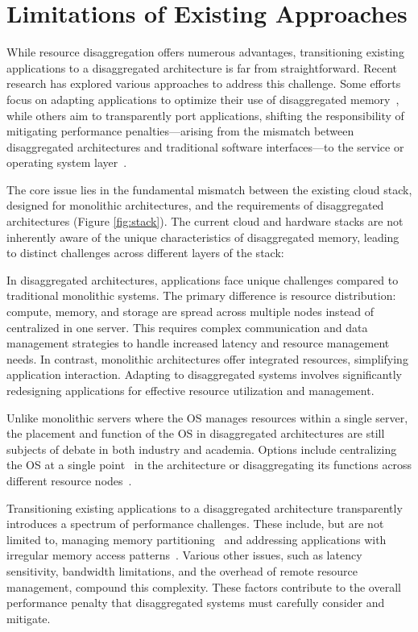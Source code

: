 \section{Limitations of Existing Approaches}

While resource disaggregation offers numerous advantages, transitioning existing applications to a disaggregated architecture is far from straightforward. Recent research has explored various approaches to address this challenge. Some efforts focus on adapting applications to optimize their use of disaggregated memory~\cite{farm, aifm, sherman, existing1}, while others aim to transparently port applications, shifting the responsibility of mitigating performance penalties—arising from the mismatch between disaggregated architectures and traditional software interfaces—to the service or operating system layer~\cite{mind, legoos, fastswap, infiniswap, runtime1, runtime2}.

The core issue lies in the fundamental mismatch between the existing cloud stack, designed for monolithic architectures, and the requirements of disaggregated architectures (Figure \ref{fig:stack}). The current cloud and hardware stacks are not inherently aware of the unique characteristics of disaggregated memory, leading to distinct challenges across different layers of the stack:

 In disaggregated architectures, applications face unique challenges compared to traditional monolithic systems. The primary difference is resource distribution: compute, memory, and storage are spread across multiple nodes instead of centralized in one server. This requires complex communication and data management strategies to handle increased latency and resource management needs. In contrast, monolithic architectures offer integrated resources, simplifying application interaction. Adapting to disaggregated systems involves significantly redesigning applications for effective resource utilization and management.

 Unlike monolithic servers where the OS manages resources within a single server, the placement and function of the OS in disaggregated architectures are still subjects of debate in both industry and academia. Options include centralizing the OS at a single point~\cite{mind} in the architecture or disaggregating its functions across different resource nodes~\cite{legoos}.

 Transitioning existing applications to a disaggregated architecture transparently introduces a spectrum of performance challenges. These include, but are not limited to, managing memory partitioning~\cite{jiffy} and addressing applications with irregular memory access patterns~\cite{chase}. Various other issues, such as latency sensitivity, bandwidth limitations, and the overhead of remote resource management, compound this complexity. These factors contribute to the overall performance penalty that disaggregated systems must carefully consider and mitigate.

